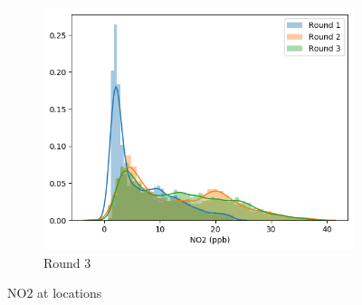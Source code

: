 \documentclass{article}
\begin{document}
\begin{figure}
\begin{subfigure}{0.32\textwidth}
\end{subfigure}
\begin{subfigure}{0.32\textwidth}
\includegraphics[width=\textwidth]{results/distributions/location_shafter_no2.png}
\caption{Round 3}
\end{subfigure}
\caption{NO2 at locations}
\label{fig:no2-locations}

\end{figure}
\end{document}
